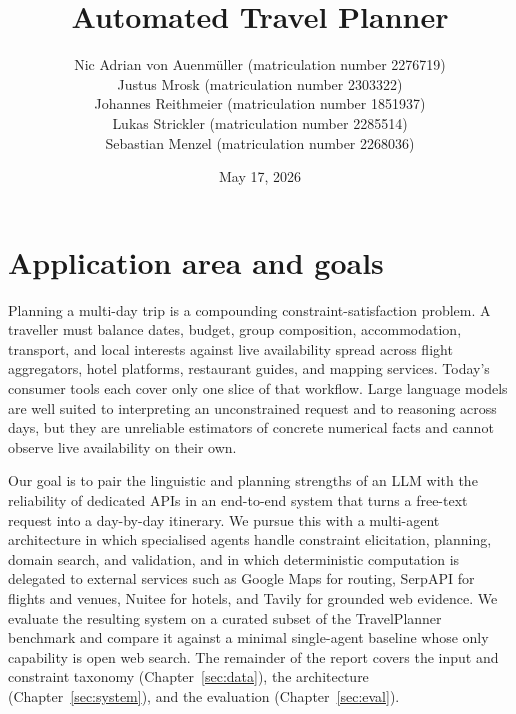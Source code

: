 \documentclass[a4paper,oneside,bibliography=totoc]{scrbook}
\begin{document}
\frontmatter \subject{Final Report} %
\title{Automated Travel Planner}
\author{
{Nic Adrian von Auenmüller (matriculation number 2276719)}\\
{Justus Mrosk (matriculation number 2303322)}\\
{Johannes Reithmeier (matriculation number 1851937)}\\
{Lukas Strickler (matriculation number 2285514)}\\
{Sebastian Menzel (matriculation number 2268036)}\\
}
\date{May 17, 2026}
\publishers{{\small Submitted to}\\
  Data and Web Science Group\\
  Prof.\ Dr.\ Christian Bizer\\
  University of Mannheim\\}
\maketitle

\begingroup%
\hypersetup{hidelinks}%
\tableofcontents%
\endgroup

\mainmatter


\chapter{Application area and goals}
\label{sec:intro}
Planning a multi-day trip is a compounding constraint-satisfaction
problem. A traveller must balance dates, budget, group composition,
accommodation, transport, and local interests against live availability
spread across flight aggregators, hotel platforms, restaurant guides,
and mapping services. Today's consumer tools each cover only one slice
of that workflow. Large language models are well suited to interpreting
an unconstrained request and to reasoning across days, but they are
unreliable estimators of concrete numerical facts and cannot observe
live availability on their own.

Our goal is to pair the linguistic and planning strengths of an LLM
with the reliability of dedicated APIs in an end-to-end system that
turns a free-text request into a day-by-day itinerary. We pursue this
with a multi-agent architecture in which specialised agents handle
constraint elicitation, planning, domain search, and validation, and in
which deterministic computation is delegated to external services such
as Google Maps for routing, SerpAPI for flights and venues, Nuitee for
hotels, and Tavily for grounded web evidence. We evaluate the resulting
system on a curated subset of the TravelPlanner benchmark
\cite{xie2024travelplanner} and compare it against a minimal
single-agent baseline whose only capability is open web search. The
remainder of the report covers the input and constraint taxonomy
(Chapter~\ref{sec:data}), the architecture (Chapter~\ref{sec:system}),
and the evaluation (Chapter~\ref{sec:eval}).
\end{document}
